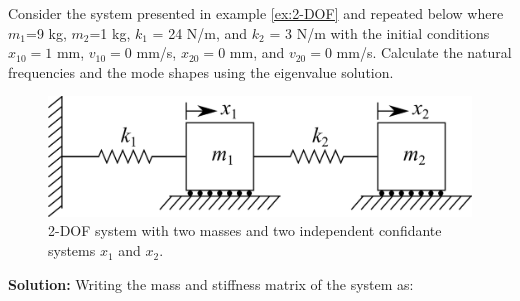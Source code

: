 \documentclass[12pt,letter]{article}
\begin{document}
	
	\begin{example}
	Consider the system presented in example \ref{ex:2-DOF} and repeated below where $m_1$=9 kg, $m_2$=1 kg, $k_1$ = 24 N/m, and $k_2$ = 3 N/m with the initial conditions $x_{10}=1$ mm, $v_{10}=0$ mm/s, $x_{20}=0$ mm, and $v_{20}=0$ mm/s. Calculate the natural frequencies and the mode shapes using the eigenvalue solution. 
	\begin{figure}[H]
		\centering
		\includegraphics[]{../figures/2-DOF-spring_mass_horizontal.png}
		\caption{2-DOF system with two masses and two independent confidante systems $x_1$ and $x_2$.}
	\end{figure}
	
	
	
	
	\textbf{Solution:} Writing the mass and stiffness matrix of the system as:
	

\end{example}
\end{document}
